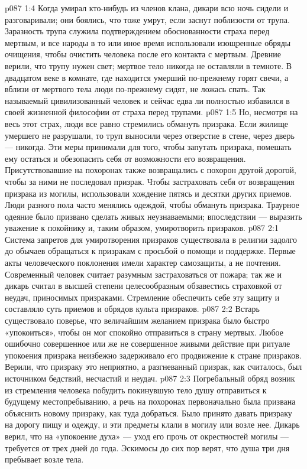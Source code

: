 \vs p087 1:4 Когда умирал кто\hyp{}нибудь из членов клана, дикари всю ночь сидели и разговаривали; они боялись, что тоже умрут, если заснут поблизости от трупа. Заразность трупа служила подтверждением обоснованности страха перед мертвым, и все народы в то или иное время использовали изощренные обряды очищения, чтобы очистить человека после его контакта с мертвым. Древние верили, что трупу нужен свет; мертвое тело никогда не оставляли в темноте. В двадцатом веке в комнате, где находится умерший по\hyp{}прежнему горят свечи, а вблизи от мертвого тела люди по\hyp{}прежнему сидят, не ложась спать. Так называемый цивилизованный человек и сейчас едва ли полностью избавился в своей жизненной философии от страха перед трупами.
\vs p087 1:5 Но, несмотря на весь этот страх, люди все равно стремились обмануть призрака. Если жилище умершего не разрушали, то труп выносили через отверстие в стене, через дверь --- никогда. Эти меры принимали для того, чтобы запутать призрака, помешать ему остаться и обезопасить себя от возможности его возвращения. Присутствовавшие на похоронах также возвращались с похорон другой дорогой, чтобы за ними не последовал призрак. Чтобы застраховать себя от возвращения призрака из могилы, использовали хождение пятясь и десятки других приемов. Люди разного пола часто менялись одеждой, чтобы обмануть призрака. Траурное одеяние было призвано сделать живых неузнаваемыми; впоследствии --- выразить уважение к покойнику и, таким образом, умиротворить призраков.
\vs p087 2:1 Система запретов для умиротворения призраков существовала в религии задолго до обычаев обращаться к призракам с просьбой о помощи и поддержке. Первые акты человеческого поклонения имели характер самозащиты, а не почтения. Современный человек считает разумным застраховаться от пожара; так же и дикарь считал в высшей степени целесообразным обзавестись страховкой от неудач, приносимых призраками. Стремление обеспечить себе эту защиту и составляло суть приемов и обрядов культа призраков.
\vs p087 2:2 \pc Встарь существовало поверье, что величайшим желанием призрака было быстро «упокоиться», чтобы он мог спокойно отправиться в страну мертвых. Любое ошибочно совершенное или же не совершенное живыми действие при ритуале упокоения призрака неизбежно задерживало его продвижение к стране призраков. Верили, что призраку это неприятно, а разгневанный призрак, как считалось, был источником бедствий, несчастий и неудач.
\vs p087 2:3 Погребальный обряд возник из стремления человека побудить покинувшую тело душу отправиться к будущему местопребыванию, а речь на похоронах первоначально была призвана объяснить новому призраку, как туда добраться. Было принято давать призраку на дорогу пищу и одежду, и эти предметы клали в могилу или возле нее. Дикарь верил, что на «упокоение духа» --- уход его прочь от окрестностей могилы --- требуется от трех дней до года. Эскимосы до сих пор верят, что душа три дня пребывает возле тела.
